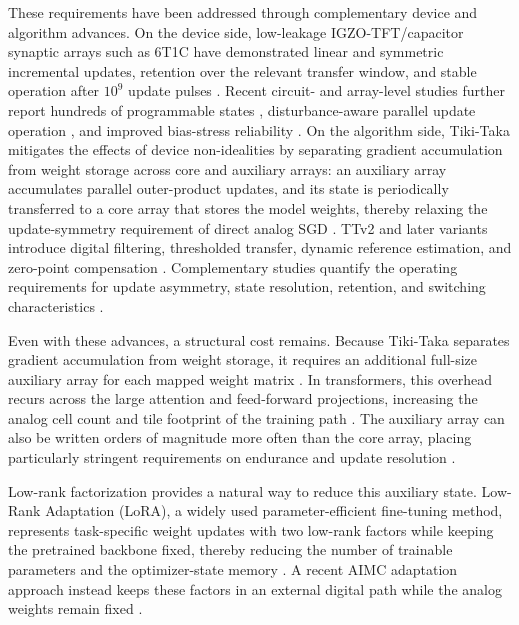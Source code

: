 \documentclass[fleqn,10pt]{wlscirep}
\begin{document}
\noindent
These requirements have been addressed through complementary device and algorithm advances.
On the device side, low-leakage IGZO-TFT/capacitor synaptic arrays such as 6T1C have demonstrated linear and symmetric incremental updates, retention over the relevant transfer window, and stable operation after \(10^{9}\) update pulses \cite{won2023advs_6t1c}.
Recent circuit- and array-level studies further report hundreds of programmable states \cite{kang2025jssc_6t1c}, disturbance-aware parallel update operation \cite{kang2025advs_disturbance}, and improved bias-stress reliability \cite{han2025acsami_gi}.
On the algorithm side, Tiki-Taka mitigates the effects of device non-idealities by separating gradient accumulation from weight storage across core and auxiliary arrays: an auxiliary array accumulates parallel outer-product updates, and its state is periodically transferred to a core array that stores the model weights, thereby relaxing the update-symmetry requirement of direct analog SGD \cite{gokmen2020tikitaka,onen2022asymmetric}.
TTv2 and later variants introduce digital filtering, thresholded transfer, dynamic reference estimation, and zero-point compensation \cite{gokmen2021ttv2,rasch2024fastrobust,noh2024retention_zeroshifting}.
Complementary studies quantify the operating requirements for update asymmetry, state resolution, retention, and switching characteristics \cite{lee2022tikitaka_asymmetry,byun2024devicespec_tikitaka,stecconi2024nanolett_tikitaka}.

\noindent
Even with these advances, a structural cost remains.
Because Tiki-Taka separates gradient accumulation from weight storage, it requires an additional full-size auxiliary array for each mapped weight matrix \cite{gokmen2020tikitaka,rasch2024fastrobust}.
In transformers, this overhead recurs across the large attention and feed-forward projections, increasing the analog cell count and tile footprint of the training path \cite{vaswani2017attention,chen2025albertanalog}.
The auxiliary array can also be written orders of magnitude more often than the core array, placing particularly stringent requirements on endurance and update resolution \cite{gokmen2021ttv2,rasch2024fastrobust}.

\noindent
Low-rank factorization provides a natural way to reduce this auxiliary state.
Low-Rank Adaptation (LoRA), a widely used parameter-efficient fine-tuning method, represents task-specific weight updates with two low-rank factors while keeping the pretrained backbone fixed, thereby reducing the number of trainable parameters and the optimizer-state memory \cite{ding2023delta,hu2021lora}.
A recent AIMC adaptation approach instead keeps these factors in an external digital path while the analog weights remain fixed \cite{li2026ahwa_lora}.
\end{document}
